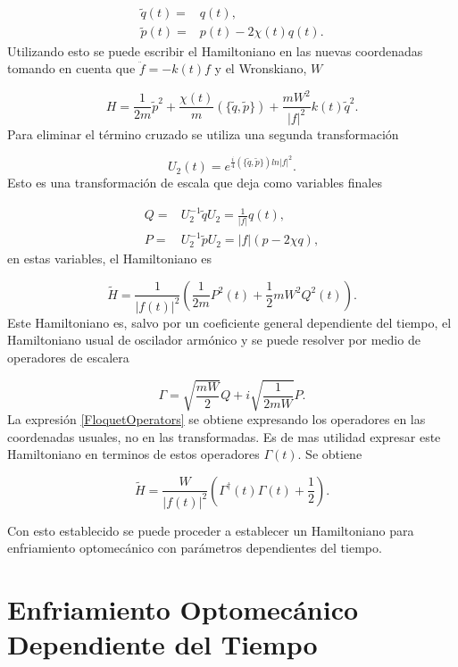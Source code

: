 \documentclass[10pt,a4paper]{report}
\begin{document}
\begin{align}
\tilde{q}(t)=&q(t),\\
\tilde{p}(t)=&p(t)-2\chi(t)q(t).
\end{align}Utilizando esto se puede escribir el Hamiltoniano en las nuevas coordenadas tomando en cuenta que $\ddot{f}= -k(t)f$ y el Wronskiano, $W$

\begin{equation}
 H = \frac{1}{2m}\tilde{p}^2 + \frac{\chi(t)}{m}(\{\tilde{q},\tilde{p}\}) + \frac{mW^2}{|f|^2}k(t)\tilde{q}^2.
\end{equation}Para eliminar el término cruzado se utiliza una segunda transformación

\begin{equation}
U_2(t)=e^{\frac{i}{4}(\{\tilde{q},\tilde{p}\})ln|f|^2}.
\end{equation}Esto es una transformación de escala que deja como variables finales

\begin{align}
Q=&U_2^{-1}\tilde{q}U_2 =\frac{1}{|f|}q(t),\\
P=&U_2^{-1}\tilde{p}U_2 = |f|(p-2\chi q), 
\end{align} en estas variables, el Hamiltoniano es

\begin{equation}\label{QTDHO}
\tilde{H} = \frac{1}{|f(t)|^2}(\frac{1}{2m}P^2(t)+\frac{1}{2}mW^2Q^2(t)).
\end{equation}Este Hamiltoniano es, salvo por un coeficiente general dependiente del tiempo, el Hamiltoniano usual de oscilador armónico y se puede resolver por medio de operadores de escalera

\begin{equation}
\Gamma = \sqrt{\frac{mW}{2}}Q + i \sqrt{\frac{1}{2mW}}P.
\end{equation} La expresión \eqref{FloquetOperators} se obtiene expresando los operadores en las coordenadas usuales, no en las transformadas. Es de mas utilidad expresar este Hamiltoniano en terminos de estos operadores $\Gamma(t)$. Se obtiene

\begin{equation}
\tilde{H} = \frac{W}{|f(t)|^2}(\Gamma^\dagger(t)\Gamma(t) + \frac{1}{2}).
\end{equation}

Con esto establecido se puede proceder a establecer un Hamiltoniano para enfriamiento optomecánico con parámetros dependientes del tiempo.

\chapter{Enfriamiento Optomecánico Dependiente del Tiempo}
\end{document}
